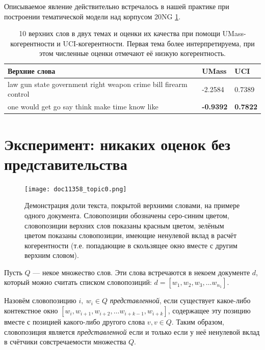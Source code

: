 Описываемое явление действительно встречалось в нашей практике при построении тематической модели над корпусом 20NG \ref{fig:law_gun_would}.

\begin{table}[t]
    \caption{10 верхних слов в двух темах и оценки их качества при помощи UMass-когерентности и UCI-когерентности. Первая тема более интерпретируема, при этом численные оценки отмечают её низкую когерентность.}
    \label{fig:law_gun_would}
    \small
    \begin{tabular}{ | p{7.5cm}| p{3.5cm} |p{3.5cm} |}
    \hline
    Верхние слова &  UMass & UCI
    \\ \hline	
law gun state government right weapon crime bill firearm control &
-2.2584 & 0.7389
    \\ \hline
one would get go say think make time know like & \textbf{-0.9392} & \textbf{0.7822}
    \\ \hline
    \end{tabular}
\end{table}

\section{Эксперимент: никаких оценок без представительства}
\label{sec:represented}


\begin{figure}
        \texttt{[image: doc11358\_topic0.png]} %
    \caption{Демонстрация доли текста, покрытой верхними словами, на примере одного документа. Словопозиции обозначены серо-синим цветом, словопозиции верхних слов показаны красным цветом, зелёным цветом показаны словопозиции, имеющие ненулевой вклад в расчёт когерентности (т.е. попадающие в скользящее окно вместе с другим верхним словом).}
\label{fig:ch3_doc_compound}
\end{figure}


Пусть $Q$ --- некое множество слов. Эти слова встречаются в некоем документе $d$, который можно считать списком словопозиций: $d = [w_1, w_2, w_3, \dots w_{n_1}]$.

Назовём словопозицию $i, ~w_i \in Q$ \textit{представленной}, если существует какое-либо контекстное окно $[w_i, w_{i+1}, w_{i+2}, \dots w_{i+k-1}, w_{i+k}]$, содержащее эту позицию вместе с позицией какого-либо другого слова $v, v \in Q$. Таким образом, словопозиция является \textit{представленной} если и только если у неё ненулевой вклад в счётчики совстречаемости множества $Q$.

